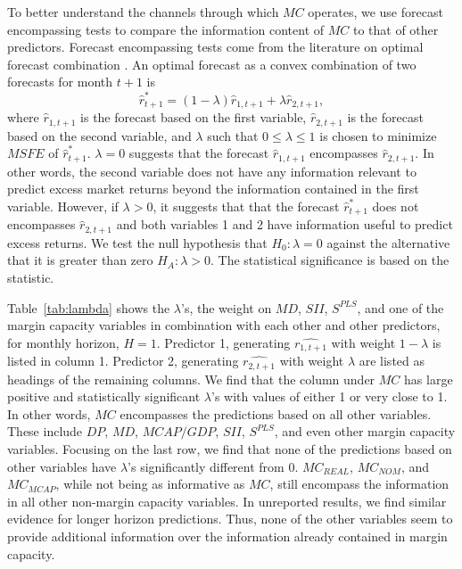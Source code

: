 To better understand the channels through which $MC$ operates, we use forecast encompassing tests to compare the information content of $MC$ to that of other predictors. Forecast encompassing tests come from the literature on optimal
forecast combination \citep{Chong1986,Fair1990}. An optimal
forecast as a convex combination of two forecasts for month $t+1$
is
\begin{equation} \label{eq:forecast_comb}
\hat r^{*}_{t+1} = (1-\lambda)\hat r_{1,t+1} + \lambda \hat r_{2,t+1},
\end{equation}
where $\hat r_{1,t+1}$ is the forecast based on the first
variable, $\hat r_{2,t+1}$ is the forecast based on the second
variable, and  $\lambda$ such that $0 \leq \lambda \leq 1$ is
chosen to minimize $MSFE$ of $\hat r^{*}_{t+1}$. $\lambda=0$
suggests that the forecast $\hat r_{1,t+1}$ encompasses $\hat
r_{2,t+1}$. In other words, the second variable does not have any
information relevant to predict excess market returns beyond the
information contained in the first variable. However, if $ \lambda
> 0$, it suggests that that the forecast $\hat r^{*}_{t+1}$ does not
encompasses $\hat r_{2,t+1}$ and both variables 1 and 2 have
information useful to predict excess returns. We test the null
hypothesis that $H_{0}: \lambda = 0$ against the alternative that
it is greater than zero $H_{A}: \lambda > 0$. The statistical
significance is based on the \cite{Harvey1998} statistic.

Table~\ref{tab:lambda} shows the $\lambda$'s, the weight on $MD$,
$SII$, $S^{PLS}$, and one of the margin capacity variables in
combination with each other and other predictors, for monthly
horizon, $H=1$. Predictor 1, generating $\hat{r_{1,t+1}}$
with weight $1 - \lambda$ is listed in column 1. Predictor 2,
generating $\hat{r_{2,t+1}}$ with weight $\lambda$ are listed as
headings of the remaining columns. We find that the column under $MC$ has large
positive and statistically significant $\lambda$'s with values of
either 1 or very close to 1. In other words, $MC$ encompasses the
predictions based on all other variables. These include $DP$,
$MD$, $MCAP/GDP$, $SII$, $S^{PLS}$, and even other margin capacity
variables. Focusing on the last row, we find that none of the
predictions based on other variables have $\lambda$'s
significantly different from 0. $MC_{REAL}$, $MC_{NOM}$, and
$MC_{MCAP}$, while not being as informative as $MC$, still
encompass the information in all other non-margin capacity
variables. In unreported results, we find similar evidence for longer horizon
predictions. Thus, none of the other variables seem to provide
additional information over the information already contained in margin capacity.

